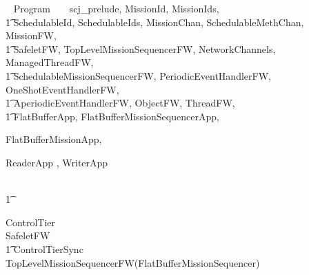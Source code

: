 
%
\begin{zsection}
  \SECTION ~ Program ~ \parents ~ scj\_prelude, MissionId, MissionIds, \\
  \t1 SchedulableId, SchedulableIds, MissionChan, SchedulableMethChan, MissionFW,\\
  \t1 SafeletFW, TopLevelMissionSequencerFW, NetworkChannels, ManagedThreadFW, \\
  \t1 SchedulableMissionSequencerFW, PeriodicEventHandlerFW, OneShotEventHandlerFW,\\
  \t1 AperiodicEventHandlerFW, ObjectFW, ThreadFW, \\
  \t1 FlatBufferApp, FlatBufferMissionSequencerApp,

FlatBufferMissionApp,

ReaderApp
	,
WriterApp
	
\\ \t1
	
	
\end{zsection}
%
\begin{circus}
\circprocess ControlTier \circdef \\
\circblockopen
SafeletFW \\
\t1 \lpar ControlTierSync \rpar \\
TopLevelMissionSequencerFW(FlatBufferMissionSequencer)
\circblockclose
\end{circus}
%


